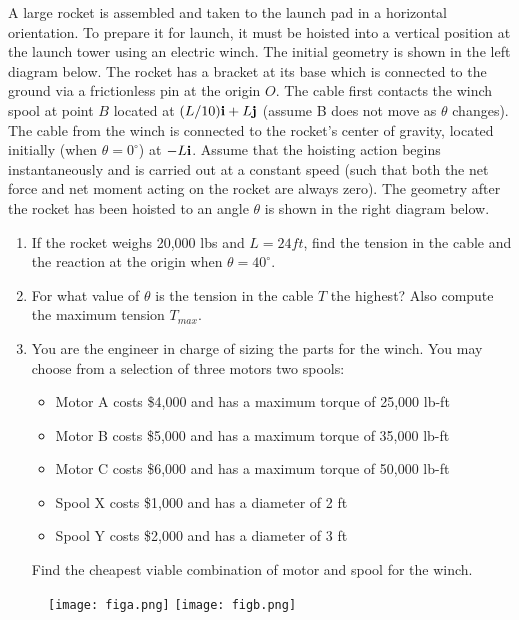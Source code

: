 
A large rocket is assembled and taken to the launch pad in a horizontal orientation. To prepare it for launch,
it must be hoisted into a vertical position at the launch tower using an electric winch. The initial geometry is
shown in the left diagram below. The rocket has a bracket at its base which is connected to the ground via
a frictionless pin at the origin $O$. The cable first contacts the winch spool at point $B$ located at $(L/10){\bf i} + L{\bf j}$
(assume B does not move as $\theta$ changes). The cable from the winch is connected to the rocket's center of gravity,
located initially (when $\theta = 0^\circ$) at $-L{\bf i}$. Assume that the hoisting action begins instantaneously and is carried
out at a constant speed (such that both the net force and net moment acting on the rocket are always zero).
The geometry after the rocket has been hoisted to an angle $\theta$ is shown in the right diagram below.
\begin{enumerate}
  \item If the rocket weighs 20,000 lbs and $L = 24 ft$, find the tension in the cable and the reaction at the origin when $\theta = 40^\circ$.
  \item For what value of $\theta$ is the tension in the cable $T$ the highest? Also compute the maximum tension $T_{max}$.
  \item You are the engineer in charge of sizing the parts for the winch. You may choose from a selection of three motors two spools:
  \begin{itemize}
	\item Motor A costs \$4,000 and has a maximum torque of 25,000 lb-ft
	\item Motor B costs \$5,000 and has a maximum torque of 35,000 lb-ft
	\item Motor C costs \$6,000 and has a maximum torque of 50,000 lb-ft
        \item Spool X costs \$1,000 and has a diameter of 2 ft
	\item Spool Y costs \$2,000 and has a diameter of 3 ft
  \end{itemize}
Find the cheapest viable combination of motor and spool for the winch.
\end{enumerate}

\begin{figure}[ht!]
  \centering
  \texttt{[image: figa.png]}
  \texttt{[image: figb.png]}
\end{figure}

\iftoggle{flagSoln}{%
\vspace{.5cm}
\rule{\textwidth}{.4pt}
\vspace{.5cm}
\textbf{Solution:}
\begin{figure}[ht!]
  \centering
  \texttt{[image: soln.png]}
\end{figure}
}{%
}%
